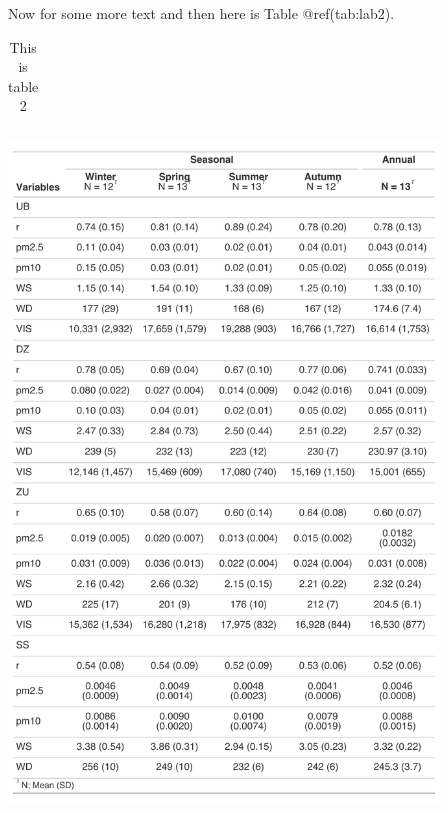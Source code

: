 \documentclass[
  11pt,
]{article}
\begin{document}
\newpage

Now for some more text and then here is Table @ref(tab:lab2).

\begin{table}[ht]
\centering
\begingroup\fontsize{0.1pt}{0.1pt}\selectfont
\begin{tabular}{r}
   \\ 
 \end{tabular}
\endgroup
\caption{This is table 2} 
\label{tab:lab2}
\end{table}

\begin{center}\includegraphics[width=4.5in]{images/tbl2_seasonal_to_annual} \end{center}

\newpage
\end{document}
